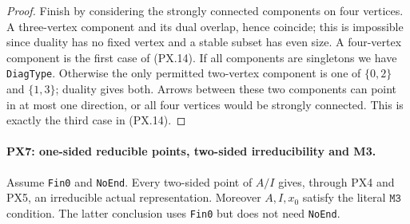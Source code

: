 \begin{proof}
Finish by considering the strongly connected
components on four vertices.  A three-vertex
component and its dual overlap, hence coincide;
this is impossible since duality has no fixed
vertex and a stable subset has even size.
A four-vertex component is the first case of
(PX.14).  If all components are singletons
we have \texttt{DiagType}.  Otherwise the
only permitted two-vertex component is one
of $\{0,2\}$ and $\{1,3\}$; duality gives
both.  Arrows between these two components
can point in at most one direction, or all
four vertices would be strongly connected.
This is exactly the third case in (PX.14).
\end{proof}

\paragraph{PX7: one-sided reducible points, two-sided irreducibility and M3.}
\label{claim:PX7}
Assume \texttt{Fin0} and \texttt{NoEnd}.  Every two-sided
point of $A/I$ gives, through PX4 and PX5, an irreducible
actual representation.  Moreover $A,I,x_0$ satisfy the
literal $\mathtt{M3}$ condition.  The latter conclusion
uses \texttt{Fin0} but does not need \texttt{NoEnd}.

